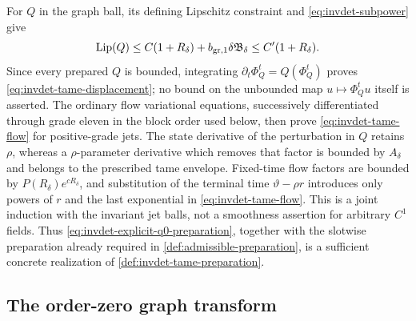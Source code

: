 For \(Q\) in the graph ball, its defining Lipschitz constraint
and \cref{eq:invdet-subpower} give
\begin{equation}
 \operatorname{Lip}(Q)
 \leq C(1+R_\delta)+b_{\rm gr,1}\delta\mathfrak B_\delta
 \leq C'(1+R_\delta).                                 \label{eq:invdet-Q-lipschitz}
\end{equation}
Since every prepared \(Q\) is bounded, integrating
\(\partial_t\Phi_Q^t=Q(\Phi_Q^t)\) proves
\cref{eq:invdet-tame-displacement}; no bound on the unbounded map
\(u\mapsto\Phi_Q^tu\) itself is asserted.  The ordinary flow variational
equations, successively differentiated through grade eleven in the block
order used below, then prove \cref{eq:invdet-tame-flow} for positive-grade
jets.  The state derivative of the perturbation in
\(Q\) retains \(\rho\), whereas a \(\rho\)-parameter derivative which
removes that factor is bounded by \(A_\delta\) and belongs to the prescribed
tame envelope.  Fixed-time flow factors are bounded by
\(P(R_\delta)e^{cR_\delta}\), and substitution of the terminal time
\(\vartheta-\rho r\) introduces only powers of \(r\) and the last
exponential in \cref{eq:invdet-tame-flow}.  This is a joint induction with
the invariant jet balls, not a smoothness assertion for arbitrary \(C^1\)
fields.  Thus
\cref{eq:invdet-explicit-q0-preparation}, together with the slotwise
preparation already required in \cref{def:admissible-preparation}, is a
sufficient concrete realization of
\cref{def:invdet-tame-preparation}.


\subsection{The order-zero graph transform}

